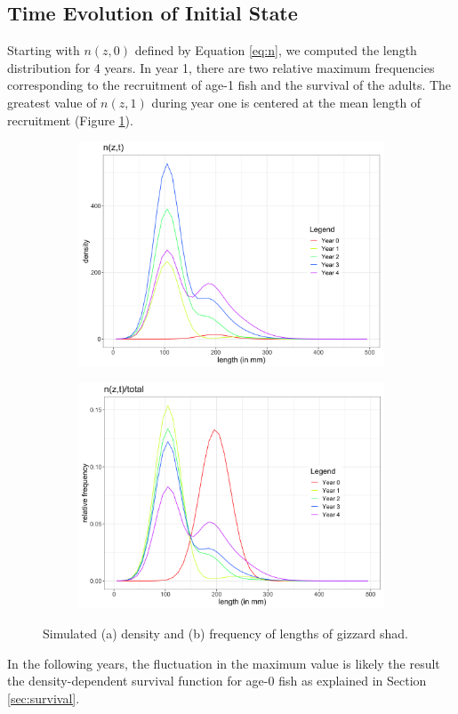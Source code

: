 \documentclass[preprint,review,12pt,authoryear]{elsarticle}
\begin{document}
\subsection{Time Evolution of Initial State}
Starting with $n(z,0)$ defined by Equation \ref{eq:n}, we computed the length distribution for 4 years.  
In year 1, there are two relative maximum frequencies corresponding to the recruitment of age-1 fish and the survival of the adults.
The greatest value of $n(z,1)$ during year one is centered at the mean length of recruitment (Figure \ref{fig:length_den}). 
 \begin{figure}
\centering
\begin{subfigure}[b]{.43\textwidth}
  \includegraphics[width=\textwidth]{figures/initial_sim_den.png}
\caption{}
\label{fig:length_den}
\end{subfigure}
\begin{subfigure}[b]{.43\textwidth}
\includegraphics[width=\textwidth]{figures/initial_sim.png}
\caption{}
\label{fig:length_dist}
\end{subfigure}
\caption{Simulated (a) density and (b) frequency of lengths of gizzard shad. }
\end{figure}    
In the following years, the fluctuation in the maximum value is likely the result the density-dependent survival function for age-0 fish as explained in Section \ref{sec:survival}. 
\end{document}
